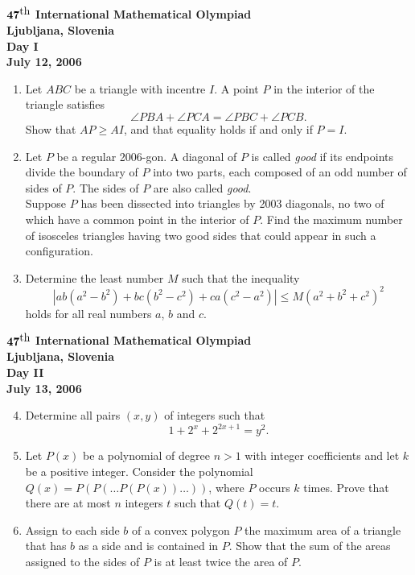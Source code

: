 \documentclass[12pt]{article}
\def\th{^{\scriptstyle\mbox{th}}}
\begin{document}
\begin{center}
${\bf 47\th}$ {\bf International Mathematical Olympiad} \\[.1in]
{\bf Ljubljana, Slovenia} \\ [.05in]
{\bf Day I}\\[.05in]
{\bf July 12, 2006}
\end{center}

\vspace*{.3in}

\begin{enumerate}
\item
Let $ABC$ be a triangle with incentre $I$. A point $P$ in the interior of 
the triangle satisfies
\[
\angle PBA + \angle PCA = \angle PBC + \angle PCB.
\]
Show that $AP\ge AI$, and that equality holds if and only if $P=I$.

\item
Let $P$ be a regular 2006-gon. A diagonal of $P$ is called \emph{good} if 
its endpoints divide the boundary of $P$ into two parts, each composed of 
an odd number of sides of $P$. The sides of $P$ are also called 
\emph{good}.\\
Suppose $P$ has been dissected into triangles by 2003 diagonals, no two of 
which have a common point in the interior of $P$. Find the maximum number 
of isosceles triangles having two good sides that could appear in such a 
configuration.

\item
Determine the least number $M$ such that the inequality
\[
|ab(a^2-b^2)+bc(b^2-c^2)+ca(c^2-a^2)|\le M (a^2 + b^2 + c^2)^2
\]
holds for all real numbers $a$, $b$ and $c$.
\end{enumerate}

\pagebreak %
\begin{center}
${\bf 47\th}$ {\bf International Mathematical Olympiad} \\[.1in]
{\bf Ljubljana, Slovenia} \\ [.05in]
{\bf Day II}\\[.05in]
{\bf July 13, 2006}
\end{center}

\vspace*{.3in}

\begin{enumerate}
\setcounter{enumi}{3}
\item
Determine all pairs $(x,y)$ of integers such that
\[
1 + 2^x + 2^{2x+1} = y^2.
\]

\item
Let $P(x)$ be a polynomial of degree $n>1$ with integer coefficients and 
let $k$ be a positive integer. Consider the polynomial $Q(x)=P(P(\dots 
P(P(x))\dots))$, where $P$ occurs $k$ times. Prove that there are at most 
$n$ integers $t$ such that $Q(t)=t$.

\item
Assign to each side $b$ of a convex polygon $P$ the maximum area of a 
triangle that has $b$ as a side and is contained in $P$. Show that the sum 
of the areas assigned to the sides of $P$ is at least twice the area of 
$P$.
\end{enumerate}
\end{document}
